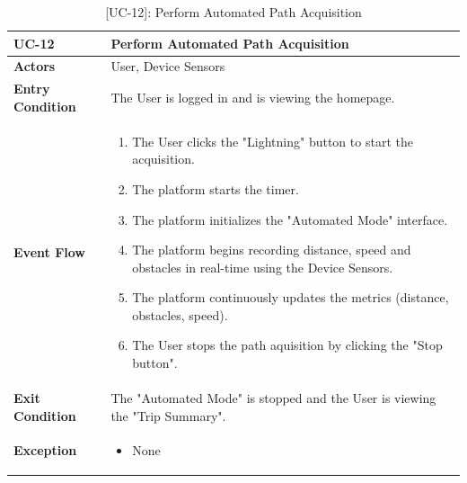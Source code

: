\begin{table}[H]
    \centering
    \setlength\extrarowheight{2pt}
    \renewcommand{\arraystretch}{1.2}
    \begin{tabularx}{\textwidth}{|>{\bfseries}l|X|}
    \hline
    UC-12& Perform Automated Path Acquisition \\ \hline
    Actors & User, Device Sensors\\ \hline
    Entry Condition & The User is logged in and is viewing the homepage.\\ \hline
    Event Flow & 
    \begin{enumerate}
      \item The User clicks the "Lightning" button to start the acquisition.
      \item The platform starts the timer.
      \item The platform initializes the "Automated Mode" interface.
      \item The platform begins recording distance, speed and obstacles in real-time using the Device Sensors.
      \item The platform continuously updates the metrics (distance, obstacles, speed).
      \item The User stops the path aquisition by clicking the "Stop button".
    \end{enumerate}
    \\ \hline
    Exit Condition & The "Automated Mode" is stopped and the User is viewing the "Trip Summary".\\ \hline
    Exception & 
    \begin{itemize}
        \item None
    \end{itemize}
    \\ \hline
   \end{tabularx}
   \caption{[UC-12]: Perform Automated Path Acquisition}
    \label{UC-12}
\end{table}

